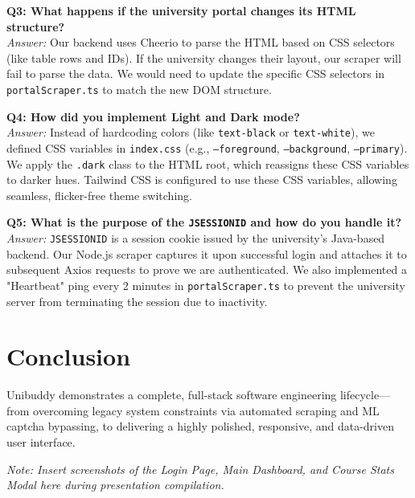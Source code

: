 \documentclass[11pt,a4paper]{article}
\begin{document}
\textbf{Q3: What happens if the university portal changes its HTML structure?} \\
\textit{Answer:} Our backend uses Cheerio to parse the HTML based on CSS selectors (like table rows and IDs). If the university changes their layout, our scraper will fail to parse the data. We would need to update the specific CSS selectors in \texttt{portalScraper.ts} to match the new DOM structure.

\textbf{Q4: How did you implement Light and Dark mode?} \\
\textit{Answer:} Instead of hardcoding colors (like \texttt{text-black} or \texttt{text-white}), we defined CSS variables in \texttt{index.css} (e.g., \texttt{--foreground}, \texttt{--background}, \texttt{--primary}). We apply the \texttt{.dark} class to the HTML root, which reassigns these CSS variables to darker hues. Tailwind CSS is configured to use these CSS variables, allowing seamless, flicker-free theme switching.

\textbf{Q5: What is the purpose of the \texttt{JSESSIONID} and how do you handle it?} \\
\textit{Answer:} \texttt{JSESSIONID} is a session cookie issued by the university's Java-based backend. Our Node.js scraper captures it upon successful login and attaches it to subsequent Axios requests to prove we are authenticated. We also implemented a "Heartbeat" ping every 2 minutes in \texttt{portalScraper.ts} to prevent the university server from terminating the session due to inactivity.

\section{Conclusion}
Unibuddy demonstrates a complete, full-stack software engineering lifecycle—from overcoming legacy system constraints via automated scraping and ML captcha bypassing, to delivering a highly polished, responsive, and data-driven user interface. 

\vspace{1cm}
\begin{center}
\textit{Note: Insert screenshots of the Login Page, Main Dashboard, and Course Stats Modal here during presentation compilation.}
\end{center}
\end{document}
